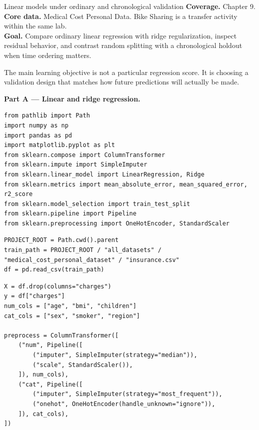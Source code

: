 
\begin{labproject}{Linear models under ordinary and chronological validation}
\textbf{Coverage.} Chapter 9.\\
\textbf{Core data.} Medical Cost Personal Data. Bike Sharing is a transfer activity within the same lab.\\
\textbf{Goal.} Compare ordinary linear regression with ridge regularization, inspect residual behavior, and contrast random splitting with a chronological holdout when time ordering matters.

\begin{labmode}
The main learning objective is not a particular regression score. It is choosing a validation design that matches how future predictions will actually be made.
\end{labmode}

\medskip\noindent\textbf{Part A --- Linear and ridge regression.}\par
\begin{lstlisting}[style=mlpython]
from pathlib import Path
import numpy as np
import pandas as pd
import matplotlib.pyplot as plt
from sklearn.compose import ColumnTransformer
from sklearn.impute import SimpleImputer
from sklearn.linear_model import LinearRegression, Ridge
from sklearn.metrics import mean_absolute_error, mean_squared_error, r2_score
from sklearn.model_selection import train_test_split
from sklearn.pipeline import Pipeline
from sklearn.preprocessing import OneHotEncoder, StandardScaler
\end{lstlisting}

\begin{lstlisting}[style=mlpython]
PROJECT_ROOT = Path.cwd().parent
train_path = PROJECT_ROOT / "all_datasets" / "medical_cost_personal_dataset" / "insurance.csv"
df = pd.read_csv(train_path)
\end{lstlisting}

\begin{lstlisting}[style=mlpython]
X = df.drop(columns="charges")
y = df["charges"]
num_cols = ["age", "bmi", "children"]
cat_cols = ["sex", "smoker", "region"]

preprocess = ColumnTransformer([
    ("num", Pipeline([
        ("imputer", SimpleImputer(strategy="median")),
        ("scale", StandardScaler()),
    ]), num_cols),
    ("cat", Pipeline([
        ("imputer", SimpleImputer(strategy="most_frequent")),
        ("onehot", OneHotEncoder(handle_unknown="ignore")),
    ]), cat_cols),
])


\end{lstlisting}
\end{labproject}
